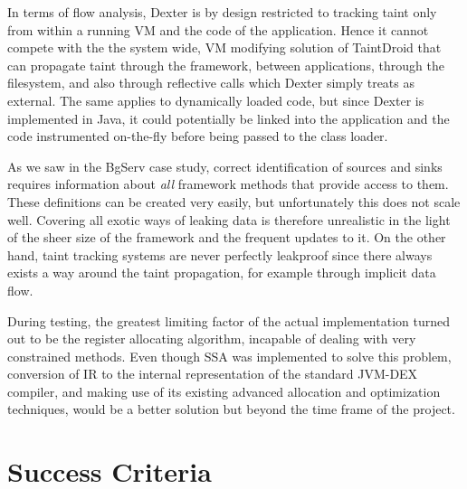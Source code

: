 \documentclass[12pt,twoside,notitlepage]{report}
\begin{document}
In terms of flow analysis, Dexter is by design restricted to tracking taint only from within a running VM and the code of the application. Hence it cannot compete with the the system wide, VM modifying solution of TaintDroid that can propagate taint through the framework, between applications, through the filesystem, and also through reflective calls which Dexter simply treats as external. The same applies to dynamically loaded code, but since Dexter is implemented in Java, it could potentially be linked into the application and the code instrumented on-the-fly before being passed to the class loader.

As we saw in the BgServ case study, correct identification of sources and sinks requires information about \emph{all} framework methods that provide access to them. These definitions can be created very easily, but unfortunately this does not scale well. Covering all exotic ways of leaking data is therefore unrealistic in the light of the sheer size of the framework and the frequent updates to it. On the other hand, taint tracking systems are never perfectly leakproof since there always exists a way around the taint propagation, for example through implicit data flow.

During testing, the greatest limiting factor of the actual implementation turned out to be the register allocating algorithm, incapable of dealing with very constrained methods. Even though SSA was implemented to solve this problem, conversion of IR to the internal representation of the standard JVM-DEX compiler, and making use of its existing advanced allocation and optimization techniques, would be a better solution but beyond the time frame of the project.

\section{Success Criteria}
\end{document}

